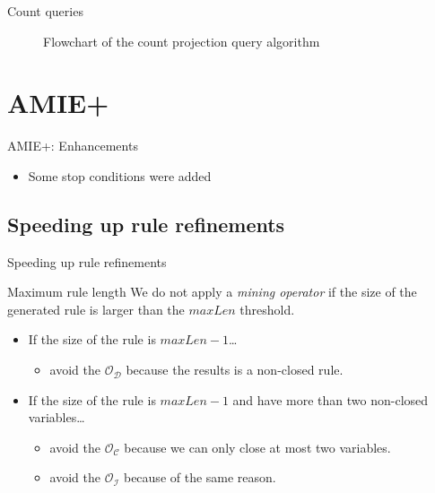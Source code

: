 \documentclass[xcolor={x11names}]{beamer}
\begin{document}
\begin{frame}{Count queries}
    \begin{figure}
    \resizebox{!}{0.75\textheight}{%
        
    }
    \caption{Flowchart of the count projection query algorithm}
    \label{fig:count_projection}
\end{figure}
\end{frame}

\section{AMIE+}
\begin{frame}{AMIE+: Enhancements}
	\begin{itemize}
   		\item Some stop conditions were added 
	\end{itemize}
\end{frame}

\subsection{Speeding up rule refinements}
\begin{frame}{Speeding up rule refinements}

    \begin{block}{Maximum rule length}
        We do not apply a \textit{mining operator} if the size of the generated rule is 
        larger than the \textbf{$maxLen$} threshold.
	\end{block}

	\begin{itemize}
        \item If the size of the rule is \textbf{$maxLen -1$}\ldots
	        \begin{itemize}
                \item avoid the $\mathcal{O}_\mathcal{D}$ because the results is a non-closed rule.
	        \end{itemize}
        \item If the size of the rule is \textbf{$maxLen -1$} and have more than two non-closed variables\ldots
	        \begin{itemize}
                \item avoid the $\mathcal{O}_\mathcal{C}$ because we can only close at most two variables.
                \item avoid the $\mathcal{O}_\mathcal{I}$ because of the same reason.
	        \end{itemize}
	\end{itemize}

\end{frame}
\end{document}
